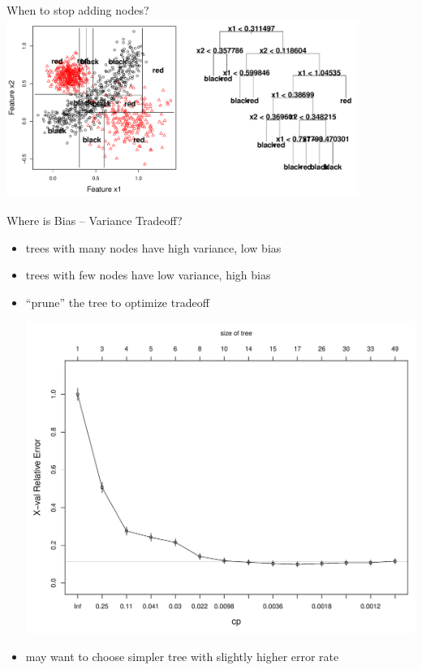 \documentclass[12pt]{beamer}
\begin{document}
\begin{frame}{When to stop adding nodes?}
\includegraphics[height=2.3in,width=4.5in]{figs/tree_11.pdf}
\end{frame}




\begin{frame}{Where is Bias -- Variance Tradeoff?}

  \begin{itemize}
  \item trees with many nodes have high variance, low bias
  \item trees with few nodes have low variance, high bias
  \item ``prune'' the tree to optimize tradeoff
  \begin{center}
    \includegraphics[scale=0.28]{figs/cart_cv.pdf}
    \end{center}
  \item may want to choose simpler tree with slightly higher error rate
  \end{itemize}


  
\end{frame}
\end{document}
